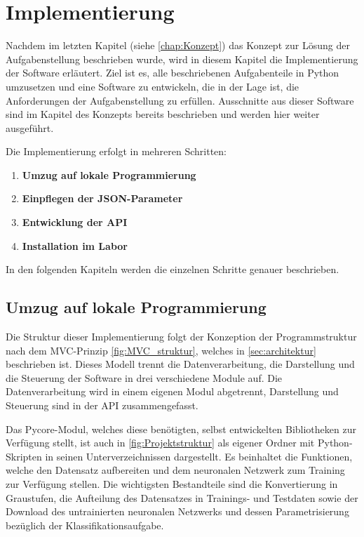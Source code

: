 \chapter{Implementierung} \label{chap:implementierung}

Nachdem im letzten Kapitel (siehe \autoref{chap:Konzept}) das Konzept zur Lösung der Aufgabenstellung beschrieben wurde, wird in diesem Kapitel die Implementierung der Software erläutert.
Ziel ist es, alle beschriebenen Aufgabenteile in Python umzusetzen und eine Software zu entwickeln, die in der Lage ist, die Anforderungen der Aufgabenstellung zu erfüllen. Ausschnitte aus dieser Software sind im Kapitel des Konzepts bereits beschrieben und werden hier weiter ausgeführt.

Die Implementierung erfolgt in mehreren Schritten:

\begin{enumerate}
    \item \textbf{Umzug auf lokale Programmierung} 
    \item \textbf{Einpflegen der JSON-Parameter} 
    \item \textbf{Entwicklung der API} 
    \item \textbf{Installation im Labor}

\end{enumerate}

In den folgenden Kapiteln werden die einzelnen Schritte genauer beschrieben.

\section{Umzug auf lokale Programmierung} \label{subsec:umzug_auf_lokale_programmierung}

Die Struktur dieser Implementierung folgt der Konzeption der Programmstruktur nach dem MVC-Prinzip \autoref{fig:MVC_struktur}, welches in \autoref{sec:architektur} beschrieben ist.
Dieses Modell trennt die Datenverarbeitung, die Darstellung und die Steuerung der Software in drei verschiedene Module auf.
Die Datenverarbeitung wird in einem eigenen Modul abgetrennt, Darstellung und Steuerung sind in der API zusammengefasst.

Das Pycore-Modul, welches diese benötigten, selbst entwickelten Bibliotheken zur Verfügung stellt, ist auch in \autoref{fig:Projektstruktur} als eigener Ordner mit Python-Skripten in seinen Unterverzeichnissen dargestellt. Es beinhaltet die Funktionen, welche den Datensatz aufbereiten und dem neuronalen Netzwerk zum Training zur Verfügung stellen.
Die wichtigsten Bestandteile sind die Konvertierung in Graustufen, die Aufteilung des Datensatzes in Trainings- und Testdaten sowie der Download des untrainierten neuronalen Netzwerks und dessen Parametrisierung bezüglich der Klassifikationsaufgabe.

